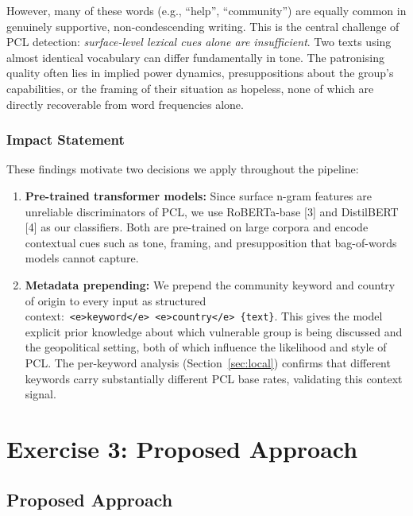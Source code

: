 \documentclass[11pt]{article}
\begin{document}
However, many of these words (e.g., ``help'', ``community'') are equally common in genuinely supportive, non-condescending writing. This is the central challenge of PCL detection: \emph{surface-level lexical cues alone are insufficient}. Two texts using almost identical vocabulary can differ fundamentally in tone. The patronising quality often lies in implied power dynamics, presuppositions about the group's capabilities, or the framing of their situation as hopeless, none of which are directly recoverable from word frequencies alone.

\subsubsection*{Impact Statement}

These findings motivate two decisions we apply throughout the pipeline:

\begin{enumerate}[noitemsep]
    \item \textbf{Pre-trained transformer models:} Since surface n-gram features are unreliable discriminators of PCL, we use RoBERTa-base [3] and DistilBERT [4] as our classifiers. Both are pre-trained on large corpora and encode contextual cues such as tone, framing, and presupposition that bag-of-words models cannot capture.

    \item \textbf{Metadata prepending:} We prepend the community keyword and country of origin to every input as structured context:\ \texttt{<e>keyword</e>\ <e>country</e>\ \{text\}}. This gives the model explicit prior knowledge about which vulnerable group is being discussed and the geopolitical setting, both of which influence the likelihood and style of PCL. The per-keyword analysis (Section~\ref{sec:local}) confirms that different keywords carry substantially different PCL base rates, validating this context signal.
\end{enumerate}

\clearpage
\section{Exercise 3: Proposed Approach}
\label{sec:approach}

\subsection{Proposed Approach}
\end{document}

